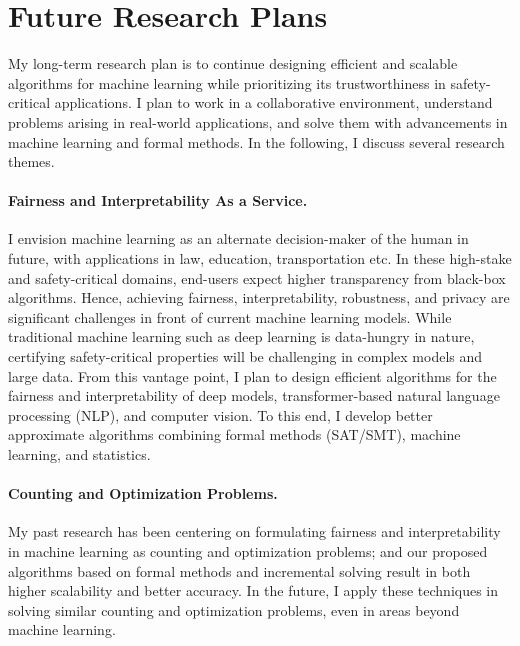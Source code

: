 \documentclass[10pt]{article}
\begin{document}
	\section*{Future Research Plans}
	 My long-term research plan is to continue designing efficient and scalable algorithms for machine learning while prioritizing its trustworthiness in safety-critical applications. I plan to work in a collaborative environment, understand problems arising in real-world applications, and solve them with advancements in machine learning and formal methods. In the following, I discuss several research themes.
	 
	 
	 \paragraph{Fairness and Interpretability As a Service.} I envision machine learning as an alternate decision-maker of the human in future, with applications in law, education, transportation etc. In these high-stake and safety-critical domains, end-users expect higher transparency from black-box algorithms. Hence, achieving fairness, interpretability, robustness, and privacy are significant challenges in front of current machine learning models. While traditional machine learning such as deep learning is data-hungry in nature, certifying safety-critical properties will be challenging in complex models and large data. From this vantage point, I plan to design efficient algorithms for the fairness and interpretability of deep models, transformer-based natural language processing (NLP), and computer vision. To this end, I develop better approximate algorithms combining formal methods (SAT/SMT), machine learning, and statistics.
	 
	 
	 \paragraph{Counting and Optimization Problems.} My past research has been centering on formulating fairness and interpretability in machine learning as counting and optimization problems; and our proposed algorithms based on formal methods and incremental solving result in both higher scalability and better accuracy. In the future, I apply these techniques in solving similar counting and optimization problems, even in areas beyond machine learning. 
	
	
	
	
\end{document}
